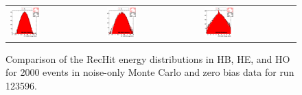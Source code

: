 \begin{figure}[h!]
 \centering
 \begin{tabular}{lll}
  \includegraphics[width=0.33\textwidth]{plots_CaloNoise/h_RecHitEinHB.eps} &
  \includegraphics[width=0.33\textwidth]{plots_CaloNoise/h_RecHitEinHE.eps} &
  \includegraphics[width=0.33\textwidth]{plots_CaloNoise/h_RecHitEinHO.eps} \\
 \end{tabular}
 \caption{\small Comparison of the RecHit energy distributions in HB, HE, and HO for 2000 events in noise-only Monte Carlo
          and zero bias data for run 123596.\label{fig:RecHitE_HCAL_1}}
\end{figure}


